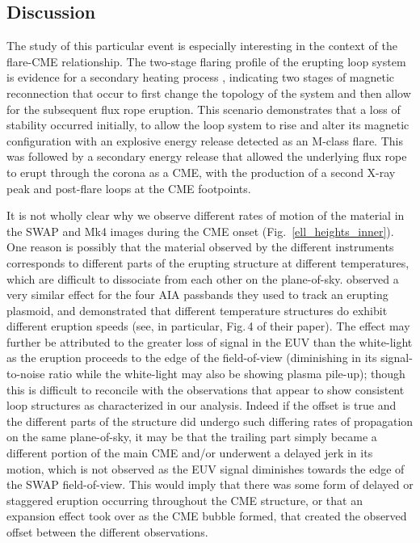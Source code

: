 \documentclass[namedreferences]{solarphysics}
\begin{document}
\begin{article}
\section{Discussion}
\label{sect:discussion}

The study of this particular event is especially interesting in the context of the flare-CME relationship. The two-stage flaring profile of the erupting loop system is evidence for a secondary heating process \cite{2012ApJ...746L...5S}, indicating two stages of magnetic reconnection that occur to first change the topology of the system and then allow for the subsequent flux rope eruption. This scenario demonstrates that a loss of stability occurred initially, to allow the loop system to rise and alter its magnetic configuration with an explosive energy release detected as an M-class flare. This was followed by a secondary energy release that allowed the underlying flux rope to erupt through the corona as a CME, with the production of a second X-ray peak and post-flare loops at the CME footpoints.


{\bf 

It is not wholly clear why we observe different rates of motion of the material in the SWAP and Mk4 images during the CME onset (Fig.~\ref{ell_heights_inner}). One reason is possibly that the material observed by the different instruments corresponds to different parts of the erupting structure at different temperatures, which are difficult to dissociate from each other on the plane-of-sky.  observed a very similar effect for the four AIA passbands they used to track an erupting plasmoid, and demonstrated that different temperature structures do exhibit different eruption speeds (see, in particular, Fig.\,4 of their paper). The effect may further be attributed to the greater loss of signal in the EUV than the white-light as the eruption proceeds to the edge of the field-of-view (diminishing in its signal-to-noise ratio while the white-light may also be showing plasma pile-up); though this is difficult to reconcile with the observations that appear to show consistent loop structures as characterized in our analysis. Indeed if the offset is true and the different parts of the structure did undergo such differing rates of propagation on the same plane-of-sky, it may be that the trailing part simply became a different portion of the main CME and/or underwent a delayed jerk in its motion, which is not observed as the EUV signal diminishes towards the edge of the SWAP field-of-view. This would imply that there was some form of delayed or staggered eruption occurring throughout the CME structure, or that an expansion effect took over as the CME bubble formed, that created the observed offset between the different observations. 



}
\end{article}
\end{document}
